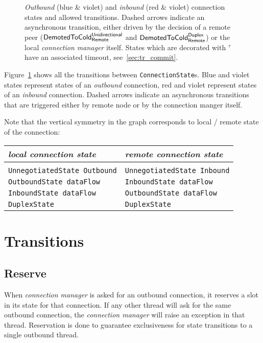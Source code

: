 \documentclass{article}
\def\UnnegotiatedStateOut{\texttt{UnnegotiatedState Outbound}}
\def\UnnegotiatedStateIn{\texttt{UnnegotiatedState Inbound}}
\def\OutboundStateAny{\texttt{OutboundState dataFlow}}
\def\DuplexState{\texttt{DuplexState}}
\def\InboundStateAny{\texttt{InboundState dataFlow}}
\def\Reserve{\textsf{Reserve}}
\def\DemotedToColdDupRem{$\text{\textsf{DemotedToCold}}^\text{\textsf{Duplex}}_\text{\textsf{Remote}}$}
\def\DemotedToColdUniRem{$\text{\textsf{DemotedToCold}}^\text{\textsf{Unidirectional}}_\text{\textsf{Remote}}$}
\def\Terminate{\textsf{Terminate}}
\def\connmngr{\textit{connection manager}}
\begin{document}
\begin{figure}[p]
{}
  \caption{\textit{Outbound} (blue \& violet) and \textit{inbound} (red \&
  violet) connection states and allowed transitions.  Dashed arrows indicate an
  asynchronous transition, either driven by the decision of a remote peer
  (\DemotedToColdUniRem{} and \DemotedToColdDupRem{}) or the local \connmngr{}
  itself. States which are decorated with $^\tau$ have an associated timeout,
  see~\ref{sec:tr_commit}.}
  \label{fig:statediagram}
\end{figure}

Figure~\ref{fig:statediagram} shows all the transitions between
\texttt{ConnectionState}s.  Blue and violet states represent states of
an \textit{outbound} connection, red and violet represent states of an
\textit{inbound} connection.  Dashed arrows indicate an asynchronous
transitions that are triggered either by remote node or by the connection
manger itself.

Note that the vertical symmetry in the graph corresponds to local / remote
state of the connection:

\begin{table}[h]
  \begin{tabular}[h]{l|l}
    \textit{local connection state} & \textit{remote connection state} \\ [0.3em]
    \hline \\ 
    \UnnegotiatedStateOut{}         & \UnnegotiatedStateIn{}           \\ [0.2em]
    \OutboundStateAny{}             & \InboundStateAny{}               \\ [0.2em]
    \InboundStateAny{}              & \OutboundStateAny{}              \\ [0.2em]
    \DuplexState{}                  & \DuplexState{}                   \\ [0.2em]
  \end{tabular}
\end{table}


\section{Transitions}

\subsection{\Reserve{}}
When \connmngr{} is asked for an outbound connection, it reserves a slot
in its state for that connection.  If any other thread will ask for the same
outbound connection, the \connmngr{} will raise an exception in that thread.
Reservation is done to guarantee exclusiveness for state transitions to
a single outbound thread.
\end{document}
